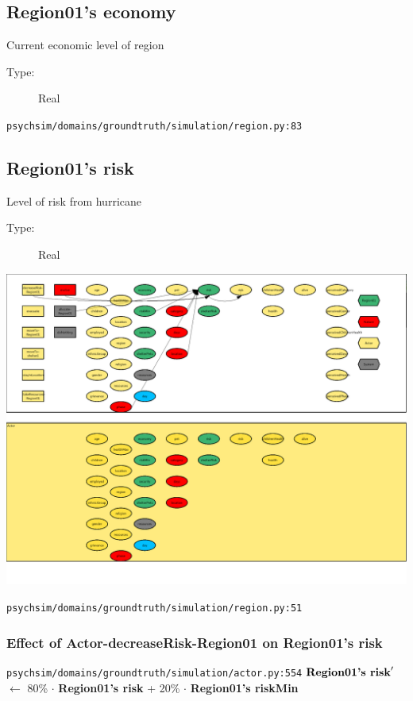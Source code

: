 \documentclass{article}%
\begin{document}
%
\subsection{Region01's economy}%
\label{subsec:Region01's economy}%
Current economic level of region%
\begin{description}%
\item[Type:]%
Real%
\end{description}%
\begin{flushleft}%
\verb|psychsim/domains/groundtruth/simulation/region.py:83|%
\end{flushleft}

%
\subsection{Region01's risk}%
\label{subsec:Region01's risk}%
Level of risk from hurricane%
\begin{description}%
\item[Type:]%
Real%
\end{description}%
\includegraphics[width=\textwidth]{images/riskOfRegion01.png}%
\begin{flushleft}%
\verb|psychsim/domains/groundtruth/simulation/region.py:51|%
\end{flushleft}%
\subsubsection{Effect of Actor{-}decreaseRisk{-}Region01 on Region01's risk}%
\label{ssubsec:Effect of Actor{-}decreaseRisk{-}Region01 on Region01's risk}%
\begin{flushleft}%
\verb|psychsim/domains/groundtruth/simulation/actor.py:554|%
\linebreak%
$\mbox{\textbf{Region01's risk}} '$%
$\leftarrow$%
80\%%
$\cdot$%
\textbf{Region01's risk}%
+%
20\%%
$\cdot$%
\textbf{Region01's riskMin}%
\end{flushleft}
\end{document}
